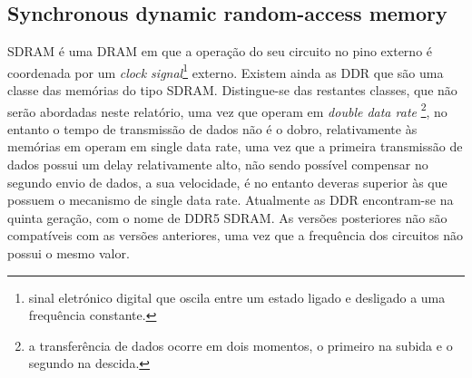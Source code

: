 \documentclass{report}
\begin{document}
\subsection{Synchronous dynamic random-access memory}
\par \ac{SDRAM} é uma {DRAM} em que a operação do seu circuito no pino externo é coordenada por um \textit{clock signal}\footnote{sinal eletrónico digital que oscila entre um estado ligado e desligado a uma frequência constante.} externo. Existem ainda as \ac{DDR} que são uma classe das memórias do tipo \ac{SDRAM}. Distingue-se das restantes classes, que não serão abordadas neste relatório, uma vez que operam em \textit{double data rate}
\footnote{a transferência de dados ocorre em dois momentos, o primeiro na subida e o segundo na descida.}, no entanto o tempo de transmissão de dados não é o dobro, relativamente às memórias em operam em single data rate, uma vez que a primeira transmissão de dados possui um delay relativamente alto, não sendo possível compensar no segundo envio de dados, a sua velocidade, é no entanto deveras superior às que possuem o mecanismo de single data rate. Atualmente as \ac{DDR} encontram-se na quinta geração, com o nome de DDR5 SDRAM. As versões posteriores não são compatíveis com as versões anteriores, uma vez que a frequência dos circuitos não possui o mesmo valor.
\end{document}
